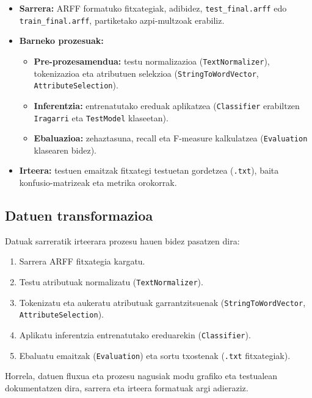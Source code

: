 \documentclass[12pt, a4paper]{article}
\begin{document}
\begin{itemize}
    \item \textbf{Sarrera:} ARFF formatuko fitxategiak, adibidez, \texttt{test\_final.arff} edo \texttt{train\_final.arff}, partiketako azpi-multzoak erabiliz.
    \item \textbf{Barneko prozesuak:}
    \begin{itemize}
        \item \textbf{Pre-prozesamendua:} testu normalizazioa (\texttt{TextNormalizer}), tokenizazioa eta atributuen selekzioa (\texttt{StringToWordVector}, \texttt{AttributeSelection}).
        \item \textbf{Inferentzia:} entrenatutako ereduak aplikatzea (\texttt{Classifier} erabiltzen \texttt{Iragarri} eta \texttt{TestModel} klaseetan).
        \item \textbf{Ebaluazioa:} zehaztasuna, recall eta F-measure kalkulatzea (\texttt{Evaluation} klasearen bidez).
    \end{itemize}
    \item \textbf{Irteera:} testuen emaitzak fitxategi testuetan gordetzea (\texttt{.txt}), baita konfusio-matrizeak eta metrika orokorrak.
\end{itemize}

\subsection{Datuen transformazioa}

Datuak sarreratik irteerara prozesu hauen bidez pasatzen dira:

\begin{enumerate}
    \item Sarrera ARFF fitxategia kargatu.
    \item Testu atributuak normalizatu (\texttt{TextNormalizer}).
    \item Tokenizatu eta aukeratu atributuak garrantzitsuenak (\texttt{StringToWordVector}, \texttt{AttributeSelection}).
    \item Aplikatu inferentzia entrenatutako ereduarekin (\texttt{Classifier}).
    \item Ebaluatu emaitzak (\texttt{Evaluation}) eta sortu txostenak (\texttt{.txt} fitxategiak).
\end{enumerate}

Horrela, datuen fluxua eta prozesu nagusiak modu grafiko eta testualean dokumentatzen dira, sarrera eta irteera formatuak argi adieraziz.
\end{document}
